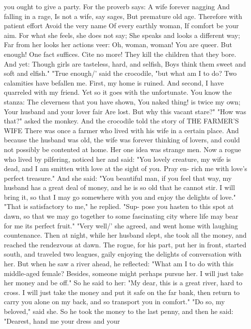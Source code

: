 \documentclass{book}
\begin{document}
you ought to give a party. For the proverb says:
A wife forever nagging
And falling in a rage,
Is not a wife, say sages,
But premature old age.
Therefore with patient effort
Avoid the very name
Of every earthly woman,
If comfort be your aim.
For what she feels, she does not say;
She speaks and looks a different way;
Far from her looks her actions veer:
Oh, woman, woman! You are queer.
But enough!
One fact suffices. Cite no more!
They kill the children that they bore.
And yet:
Though girls are tasteless, hard, and selfish,
Boys think them sweet and soft and elfish."
"True enough/' said the crocodile, "but what am
I to do? Two calamities have befallen me. First, my
home is ruined. And second, I have quarreled with
my friend. Yet so it goes with the unfortunate. You
know the stanza:
The cleverness that you have shown,
You naked thing! is twice my own;
Your husband and your lover fair
Are lost. But why this vacant stare?"
"How was that?" asked the monkey. And the
crocodile told the story of
THE FARMER'S WIFE
There was once a farmer who lived with his wife
in a certain place. And because the husband was
old, the wife was forever thinking of lovers, and
could not possibly be contented at home. Her one
idea was strange men.
Now a rogue who lived by pilfering, noticed her
and said: "You lovely creature, my wife is dead, and
I am smitten with love at the sight of you. Pray en-
rich me with love's perfect treasure."
And she said: "You beautiful man, if you feel
that way, my husband has a great deal of money,
and he is so old that he cannot stir. I will bring it, so
that I may go somewhere with you and enjoy the
delights of love."
"That is satisfactory to me," he replied. "Sup-
pose you hasten to this spot at dawn, so that we may
go together to some fascinating city where life may
bear for me its perfect fruit." "Very well/' she
agreed, and went home with laughing countenance.
Then at night, while her husband slept, she took
all the money, and reached the rendezvous at dawn.
The rogue, for his part, put her in front, started
south, and traveled two leagues, gaily enjoying the
delights of conversation with her. But when he saw
a river ahead, he reflected: "What am I to do with
this middle-aged female? Besides, someone might
perhaps pursue her. I will just take her money and
be off."
So he said to her: "My dear, this is a great river,
hard to cross. I will just take the money and put it
safe on the far bank, then return to carry you alone
on my back, and so transport you in comfort." "Do
so, my beloved," said she.
So he took the money to the last penny, and then
he said: "Dearest, hand me your dress and your
\end{document}
